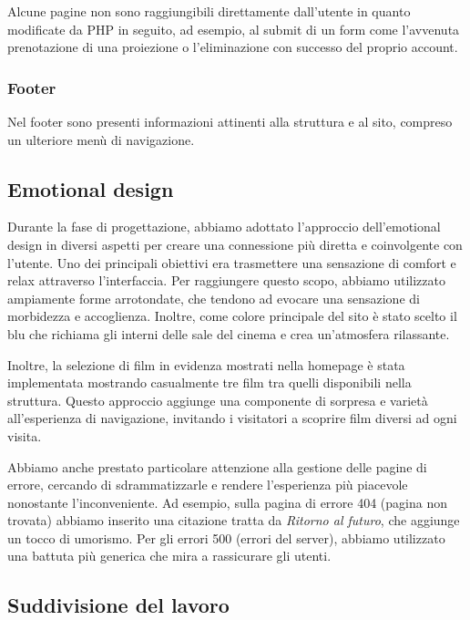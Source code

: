 Alcune pagine non sono raggiungibili direttamente dall'utente in quanto modificate da PHP in seguito, ad esempio, al submit di un form come l'avvenuta prenotazione di una proiezione o l'eliminazione con successo del proprio account.

\subsubsection{Footer}
Nel footer sono presenti informazioni attinenti alla struttura e al sito, compreso un ulteriore menù di navigazione.

\subsection{Emotional design} \label{emotional_design}
Durante la fase di progettazione, abbiamo adottato l'approccio dell'emotional design in diversi aspetti per creare una connessione più diretta e coinvolgente con l'utente. Uno dei principali obiettivi era trasmettere una sensazione di comfort e relax attraverso l'interfaccia.
Per raggiungere questo scopo, abbiamo utilizzato ampiamente forme arrotondate, che tendono ad evocare una sensazione di morbidezza e accoglienza. Inoltre, come colore principale del sito è stato scelto il blu che richiama gli interni delle sale del cinema e crea un'atmosfera rilassante.

Inoltre, la selezione di film in evidenza mostrati nella homepage è stata implementata mostrando casualmente tre film tra quelli disponibili nella struttura. Questo approccio aggiunge una componente di sorpresa e varietà all’esperienza di navigazione, invitando i visitatori a scoprire film diversi ad ogni visita.

Abbiamo anche prestato particolare attenzione alla gestione delle pagine di errore, cercando di sdrammatizzarle e rendere l'esperienza più piacevole nonostante l'inconveniente. Ad esempio, sulla pagina di errore 404 (pagina non trovata) abbiamo inserito una citazione tratta da \textit{Ritorno al futuro}, che aggiunge un tocco di umorismo. Per gli errori 500 (errori del server), abbiamo utilizzato una battuta più generica che mira a rassicurare gli utenti.

\subsection{Suddivisione del lavoro}

